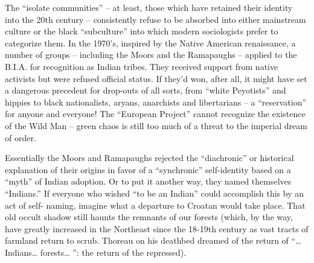 \documentclass[a4paper,english,10pt,twoside]{article}
\begin{document}
\medskip
The \enquote{isolate communities} -- at least, those which have retained their identity into the 20th century -- consistently refuse to be absorbed into either mainstream culture or the black \enquote{subculture} into which modern sociologists prefer to categorize them. In the 1970's, inspired by the Native American renaissance, a number of groups -- including the Moors and the Ramapaughs -- applied to the B.I.A. for recognition as Indian tribes. They received support from native activists but were refused official status. If they'd won, after all, it might have set a dangerous precedent for drop-outs of all sorts, from \enquote{white Peyotists} and hippies to black nationalists, aryans, anarchists and libertarians --  a \enquote{reservation} for anyone and everyone! The \enquote{European Project} cannot recognize the existence of the Wild Man --  green chaos is still too much of a threat to the imperial dream of order.

\medskip
Essentially the Moors and Ramapaughs rejected the \enquote{diachronic} or historical explanation of their origins in favor of a \enquote{synchronic} self-identity based on a \enquote{myth} of Indian adoption. Or to put it another way, they named themselves \enquote{Indians.} If everyone who wished \enquote{to be an Indian} could accomplish this by an act of self- naming, imagine what a departure to Croatan would take place. That old occult shadow still haunts the remnants of our forests (which, by the way, have greatly increased in the Northeast since the 18-19th century as vast tracts of farmland return to scrub. Thoreau on his deathbed dreamed of the return of \enquote{… Indians… forests… }: the return of the repressed).
\end{document}
